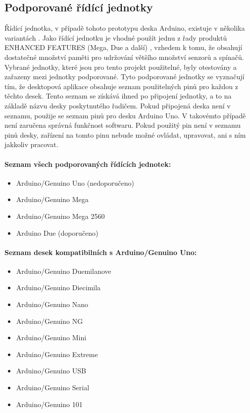 \documentclass[FM,DP]{tulthesis}  %
\begin{document}
\subsection{Podporované řídící jednotky}
Řídící jednotka, v případě tohoto prototypu deska Arduino, existuje v několika variantách \cite{ArduinoProducts}. Jako řídící jednotku je vhodné použít jednu z řady produktů ENHANCED FEATURES (Mega, Due a další) \cite{ArduinoProducts}, vzhedem k tomu, že obsahují dostatečné množství paměti \cite{CompareBoardSpecs} pro udržování většího množství senzorů a spínačů. Vybrané jednotky, které jsou pro tento projekt použitelné, byly otestovány a zařazeny mezi jednotky podporované. Tyto podporované jednotky se vyznačují tím, že desktopová aplikace obsahuje seznam použitelných pinů pro každou z těchto desek. Tento seznam se získává ihned po připojení jednotky, a to na základě názvu desky poskytnutého řadičem. Pokud připojená deska není v seznamu, použije se seznam pinů pro desku Arduino Uno. V takovémto případě není zaručena správná funkčnost softwaru. Pokud použitý pin není v seznamu pinů desky, zařízení na tomto pinu nebude možné ovládat, upravovat, ani s ním jakkoliv pracovat.

\paragraph{Seznam všech podporovaných řídících jednotek:}
\begin{itemize}
\item Arduino/Genuino Uno (nedoporučeno)
\item Arduino/Genuino Mega
\item Arduino/Genuino Mega 2560
\item Arduino Due (doporučeno)
\end{itemize}

\paragraph{Seznam desek kompatibilních s Arduino/Genuino Uno:}
\begin{itemize}
\item Arduino/Genuino Duemilanove
\item Arduino/Genuino Diecimila
\item Arduino/Genuino Nano
\item Arduino/Genuino NG
\item Arduino/Genuino Mini
\item Arduino/Genuino Extreme
\item Arduino/Genuino USB
\item Arduino/Genuino Serial
\item Arduino/Genuino 101
\end{itemize}
\end{document}
